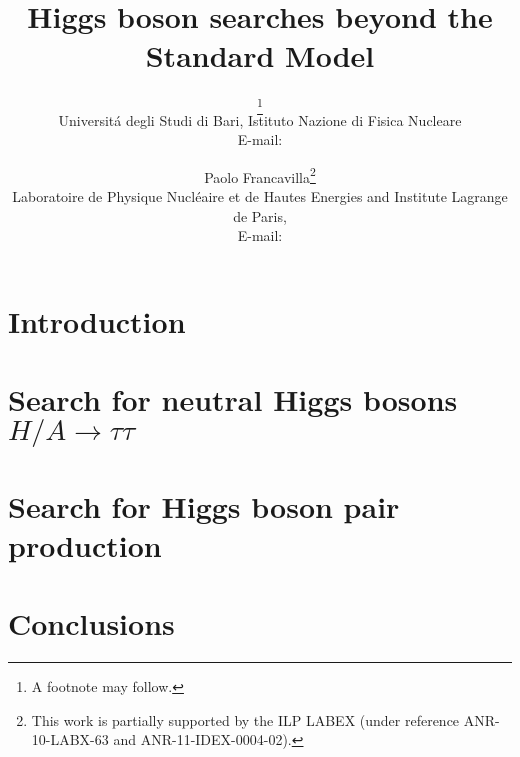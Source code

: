 \documentclass{PoS}
\title{Higgs boson searches beyond the Standard Model}
\author{\speaker{Claudio Caputo}\thanks{A footnote may follow.}\\
        Universit\'a degli Studi di Bari, Istituto Nazione di Fisica Nucleare\\
        E-mail: \email{claudio.caputo@cern.ch}}
\author{Paolo Francavilla\thanks{This work is partially supported by the ILP
LABEX (under reference ANR-10-LABX-63 and ANR-11-IDEX-0004-02).}\\
        Laboratoire de Physique Nucl\'eaire et de Hautes Energies and Institute Lagrange de Paris,\\
        E-mail: \email{paolo.francavilla@cern.ch}}
\begin{document}
\section{Introduction}


\section{Search for neutral  Higgs bosons $H/A \rightarrow \tau\tau$}


\newpage
\clearpage
\section{Search for Higgs boson pair production}


\newpage
\section{Conclusions}


{}

\end{document}
